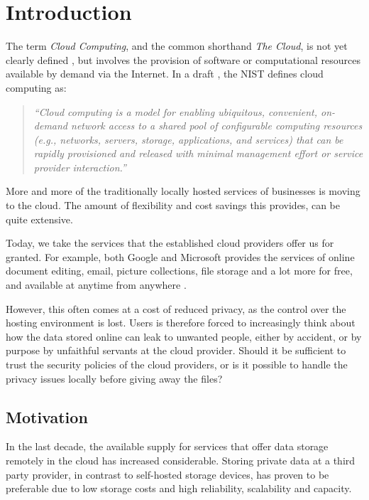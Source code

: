 \documentclass[pdftex,english,10pt,b5paper,twoside]{book}
\begin{document}
\chapter{Introduction}
\label{ch:intro}
\setcounter{page}{1}


The term \emph{Cloud Computing}, and the common shorthand \emph{The Cloud},
is not yet clearly defined \cite{clouddef}, but involves the provision of
software or computational resources available by demand via the Internet.
In a draft \cite{cloud_nistdef}, the \ac{NIST} defines cloud computing as:
\begin{quote}\it
``Cloud computing is a model for enabling ubiquitous, convenient,
on-demand network access to a shared pool of configurable computing resources
(e.g., networks, servers, storage, applications, and services) that can be
rapidly provisioned and released with minimal management effort or service
provider interaction.''
\end{quote}

More and more of the traditionally locally hosted services of businesses is
moving to the cloud. The amount of flexibility and cost savings this
provides, can be quite extensive.

Today, we take the services that the established cloud providers offer us for
granted. For example, both Google and Microsoft provides the services of online
document editing, email, picture collections, file storage and a lot more for
free, and available at anytime from anywhere \cite{googleservices,
microsoftservices}.

However, this often comes at a cost of reduced privacy, as the control over the
hosting environment is lost. Users is therefore forced to increasingly think
about how the data stored online can leak to unwanted people, either by
accident, or by purpose by unfaithful servants at the cloud provider. Should it
be sufficient to trust the security policies of the cloud providers, or is it
possible to handle the privacy issues locally before giving away the files?

\section{Motivation}

In the last decade, the available supply for services that offer data storage
remotely in the cloud has increased considerable. Storing private data at a
third party provider, in contrast to self-hosted storage devices, has proven to
be preferable due to low storage costs and high reliability, scalability and
capacity.
\end{document}
